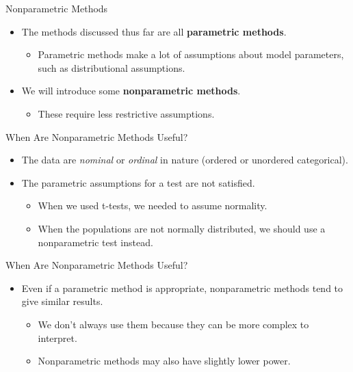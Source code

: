 \begin{frame}{Nonparametric Methods}
    \begin{itemize}
        \item The methods discussed thus far are all \textbf{parametric methods}.
        \begin{itemize}
            \item Parametric methods make a lot of assumptions about model parameters, such as distributional assumptions.
        \end{itemize}
        \item We will introduce some \textbf{nonparametric methods}.
        \begin{itemize}
            \item These require less restrictive assumptions.
        \end{itemize}
    \end{itemize}
\end{frame}

\begin{frame}{When Are Nonparametric Methods Useful?}
    \begin{itemize}
        \item The data are \textit{nominal} or \textit{ordinal} in nature (ordered or unordered categorical). 
        \item The parametric assumptions for a test are not satisfied.
        \begin{itemize}
            \item When we used t-tests, we needed to assume normality. 
            \item When the populations are not normally distributed, we should use a nonparametric test instead.
        \end{itemize}
    \end{itemize}
\end{frame}

\begin{frame}{When Are Nonparametric Methods Useful?}
    \begin{itemize}
        \item Even if a parametric method is appropriate, nonparametric methods tend to give similar results.
        \begin{itemize}
            \item We don't always use them because they can be more complex to interpret.
            \item Nonparametric methods may also have slightly lower power.
        \end{itemize}
    \end{itemize}
\end{frame}

